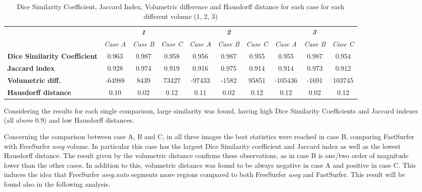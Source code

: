 \documentclass{article}
\begin{document}
	
	\begin{table}[h]
		\resizebox{1\textwidth}{!}
		{\begin{tabular}{@{}lccccccccc@{}}
				\cmidrule(l){2-10}
				& \multicolumn{3}{c}{\textit{\textbf{1}}}                                  & \multicolumn{3}{c}{\textit{\textbf{2}}}                                  & \multicolumn{3}{c}{\textit{\textbf{3}}}             \\ \cmidrule(l){2-10} 
				\multicolumn{1}{l|}{}                            & \textit{Case A} & \textit{Case B} & \multicolumn{1}{c|}{\textit{Case C}} & \textit{Case A} & \textit{Case B} & \multicolumn{1}{c|}{\textit{Case C}} & \textit{Case A} & \textit{Case B} & \textit{Case C} \\ \midrule
				\multicolumn{1}{l|}{\textbf{Dice Similarity Coefficient}}                & 0.963           & 0.987           & \multicolumn{1}{c|}{0.958}           & 0.956           & 0.987           & \multicolumn{1}{c|}{0.955}           & 0.955           & 0.987           & 0.954           \\ \midrule
				\multicolumn{1}{l|}{\textbf{Jaccard index}}      & 0.928           & 0.974           & \multicolumn{1}{c|}{0.919}           & 0.916           & 0.975           & \multicolumn{1}{c|}{0.914}           & 0.914           & 0.973           & 0.912           \\ \midrule
				\multicolumn{1}{l|}{\textbf{Volumetric diff.}}   & -64988          & 8439            & \multicolumn{1}{c|}{73427}           & -97433          & -1582           & \multicolumn{1}{c|}{95851}           & -105436         & -1691           & 103745          \\ \midrule
				\multicolumn{1}{l|}{\textbf{Hausdorff distance}} & 0.10           & 0.02            & \multicolumn{1}{c|}{0.12}           & 0.11           & 0.02            & \multicolumn{1}{c|}{0.12}           & 0.12           & 0.02            & 0.12            \\ \bottomrule
		\end{tabular}}
		\caption{Dice Similarity Coefficient, Jaccard Index, Volumetric difference and Hausdorff distance for each case for each different volume (1, 2, 3)}
		\label{Tab: Statistics}
	\end{table}

	Considering the results for each single comparison, large similarity was found, having high Dice Similarity Coefficients and Jaccard indexes (all above 0.9) and low Hausdorff distances.
	
	Concerning the comparison between case A, B and C, in all three images the best statistics were reached in case B, comparing FastSurfer with FreeSurfer \textsl{aseg} volume. In particular this case has the largest Dice Similarity coefficient and Jaccard index as well as the lowest Hausdorff distance. The result given by the volumetric distance confirms these observations, as in case B is one/two order of magnitude lower than the other cases. In addition to this, volumetric distance was found to be always negative in case A and positive in case C. This induces the idea that FreeSurfer \textsl{aseg.auto} segments more regions compared to both FreeSurfer \textsl{aseg} and FastSurfer. This result will be found also in the following analysis.
	
\end{document}
